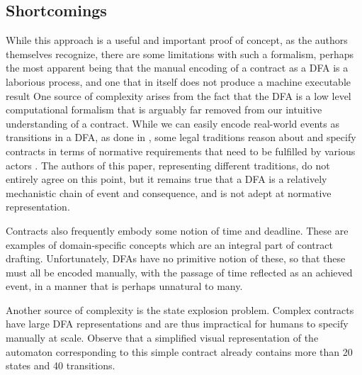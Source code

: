 \documentclass{article}
\begin{document}
\subsection{Shortcomings}
While this approach is a useful and important proof of concept, as the authors
themselves recognize, there are some limitations with such a formalism, perhaps
the most apparent being that the manual encoding of a contract as a DFA is a
laborious process, and one that in itself does not produce a machine executable
result
One source of complexity arises from the fact that the DFA is a low level
computational formalism that is arguably far removed from our intuitive
understanding of a contract.
While we can easily encode real-world events as transitions in a DFA, as done
in \cite{contract_as_automaton}, some legal traditions reason about and specify
contracts in terms of normative requirements that need to be fulfilled by
various actors \cite{normative_compliance_guido}.
The authors of this paper, representing different traditions, do not entirely
agree on this point, but it remains true that a DFA is a relatively
mechanistic chain of event and consequence, and is not adept at normative
representation.

Contracts also frequently embody some notion of time and deadline.
These are examples of domain-specific concepts which are an integral
part of contract drafting.
Unfortunately, DFAs have no primitive notion of these, so that these must all
be encoded manually, with the passage of time reflected as an achieved event,
in a manner that is perhaps unnatural to many.

Another source of complexity is the state explosion problem.
Complex contracts have large DFA representations and are thus impractical for
humans to specify manually at scale.
Observe that a simplified visual representation of the automaton
\cite[Fig. 1]{contract_as_automaton}
corresponding to this simple contract already contains more than 20 states and
40 transitions.



\end{document}
